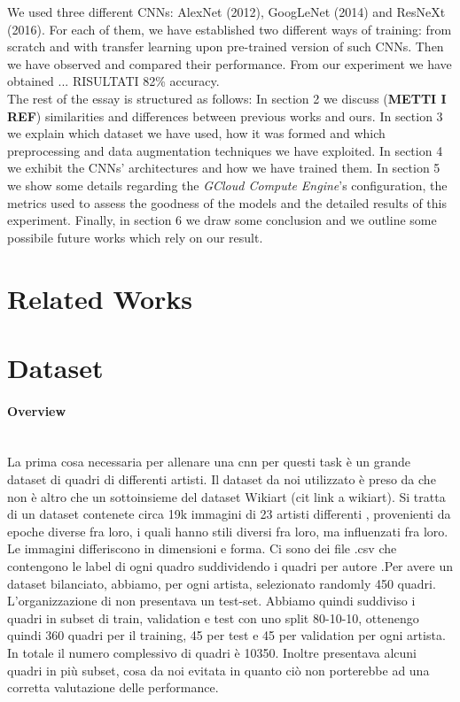 \documentclass{article}
\begin{document}
We used three different CNNs: AlexNet (2012), GoogLeNet (2014) and ResNeXt (2016). For each of them, we have established two different ways of training: from scratch and with transfer learning  upon pre-trained version of such CNNs. Then we have observed and compared their performance. From our experiment we have obtained ... RISULTATI 82\% accuracy.\\

The rest of the essay is structured as follows: In section 2 we discuss (\textbf{METTI I REF}) similarities and differences between previous works and ours. In section 3 we explain which dataset we have used, how it was formed and which preprocessing and data augmentation techniques we have exploited. In section 4 we exhibit the CNNs' architectures and how we have trained them. In section 5 we show some details regarding the \textit{GCloud Compute Engine}'s configuration, the metrics used to assess the goodness of the models and the detailed results of this experiment. Finally, in section 6 we draw some conclusion and we outline some possibile future works which rely on our result.


\section{Related Works}


\section{Dataset}

\paragraph{Overview}\mbox{}\\
La prima cosa necessaria per allenare una cnn per questi task è un grande dataset di quadri di differenti artisti. Il dataset da noi utilizzato è preso da \cite{ArtGANDataset} che non è altro che un sottoinsieme del dataset Wikiart (cit link a wikiart). Si tratta di un dataset contenete circa 19k immagini di 23 artisti differenti , provenienti da epoche diverse fra loro, i quali hanno stili diversi fra loro, ma influenzati fra loro. Le immagini differiscono in dimensioni e forma.  Ci sono dei file .csv che contengono le label di ogni quadro suddividendo i quadri per  autore .Per avere un dataset bilanciato, abbiamo, per ogni artista, selezionato randomly 450 quadri.
L'organizzazione di \cite{ArtGANDataset} non presentava un test-set. Abbiamo quindi suddiviso i quadri in subset di train, validation e test con uno split 80-10-10, ottenengo quindi 360 quadri per il training, 45 per test e 45 per validation per ogni artista. In totale il numero complessivo di quadri è 10350.
Inoltre \cite{ArtGANDataset} presentava alcuni quadri in più subset, cosa da noi evitata in quanto ciò non porterebbe ad una corretta valutazione delle performance.
\end{document}

